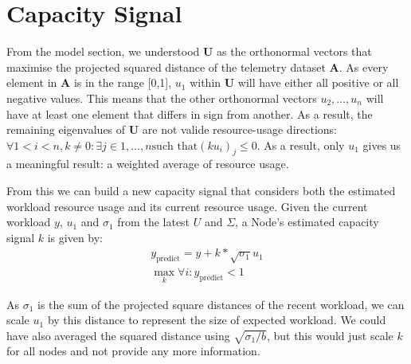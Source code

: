 \section{Capacity Signal}
\label{sec:capacity-signal}
From the model section, we understood $\textbf{U}$ as the orthonormal vectors
that maximise the projected squared distance of the telemetry dataset
$\mathbf{A}$. As every element in $\mathbf{A}$ is in the range [0,1], $u_1$
within $\mathbf{U}$ will have either all positive or all negative values. This
means that the other orthonormal vectors $u_2, \ldots, u_n$ will have at least
one element that differs in sign from another. As a result, the remaining
eigenvalues of $\mathbf{U}$ are not valide resource-usage directions: $\forall 1
< i < n, k \neq 0: \exists j \in {1,\ldots,n} \text{such that} (ku_i)_j \le 0$.
As a result, only $u_1$ gives us a meaningful result: a weighted average of
resource usage.

From this we can build a new capacity signal that considers both the estimated
workload resource usage and its current resource usage. Given the current
workload $y$, $u_1$ and $\sigma_1$ from the latest $U$ and $\Sigma$, a Node's
estimated capacity signal $k$ is given by:
\begin{align}
    y_{\text{predict}} = y + k * \sqrt{\sigma_1} u_1 \\
    \max_k \forall i: y_{\text{predict}} < 1
\end{align}

As $\sigma_1$ is the sum of the projected square distances of the recent
workload, we can scale $u_1$ by this distance to represent the size of expected
workload. We could have also averaged the squared distance using
$\sqrt{\sigma_1/b}$, but this would just scale $k$ for all nodes and not
provide any more information.

